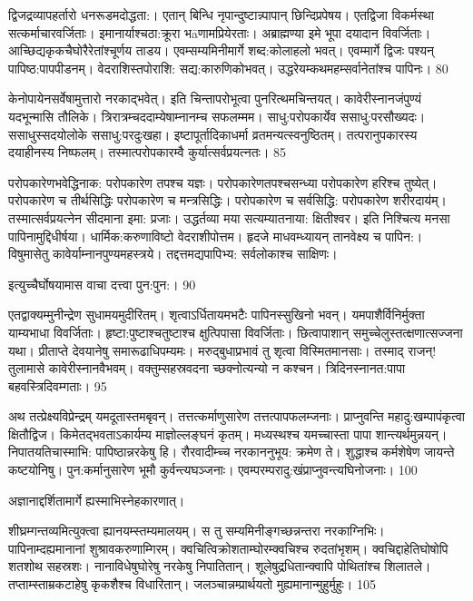 द्विजद्रव्यापहर्तारो धनरूडमदोद्धता:।
एतान् बिन्धि नृपान्दुष्टान्न्पापान् छिन्दिप्रपेषय।
एतद्विजा विकर्मस्था सत्कर्माचारवर्जिताः।
इमानार्याश्चठा:क्रूरा भāणामप्रियेरताः।
अब्राह्मण्या इमे भूपा दयादान विवर्जिताः।
आच्छिद्यकृकचैघोरैरेतांश्चूर्णय ताडय।
एवम्सम्यमिनीमार्गे शब्द:कोलाहलो भवत्।
एवम्मार्गे द्विजः पश्यन् पापिष्ठ:पापपीडनम्।
वेदराशिस्तपोराशि: सद्य:कारुणिकोभवत्।
उद्धरेयम्कथमहम्सर्वानेतांश्च पापिनः।
80



केनोपायेनसर्वेषामुत्तारो नरकाद्भवेत्।
इति चिन्तापरोभूत्वा पुनरित्थमचिन्तयत्।
कावेरीस्नानजंपुण्यं यदभून्मासि तौलिके।
त्रिरात्रम्चददाम्येषाम्नानम्च सफलम्मम।
साधु:परोपकार्येव ससाधु:परसौख्यदः।
ससाधुस्सदयोलोके ससाधु:परदुःखहा।
इष्टापूर्तादिकाधर्मा व्रतमन्यत्स्वनुष्ठितम्।
तत्परानुपकारस्य दयाहीनस्य निष्फलम्।
तस्मात्परोपकारम्वै कुर्यात्सर्वप्रयत्नतः।
85

परोपकारेणभवेद्धिनाक: परोपकारेण तपश्च यज्ञः।
परोपकारेणतपश्चसन्ध्या परोपकारेण हरिश्च तुष्येत्।
परोपकारेण च तीर्थसिद्धिः
परोपकारेण च मन्त्रसिद्धिः।
परोपकारेण च सर्वसिद्धि:
परोपकारेण शरीरदाय॑म्।
तस्मात्सर्वप्रयत्नेन सीदमाना इमा: प्रजाः।
उद्धर्तव्या मया सत्यम्यातनाया: क्षितीश्वर।
इति निश्चित्य मनसा पापिनामुद्दिधीर्षया।
धार्मिक:करुणाविष्टो वेदराशीपोत्तम।
हृदजे माधवम्ध्यायन् तानवेक्ष्य च पापिन:।
विषुमासेतु कावेर्याम्नानपुण्यमहस्त्रये।
तद्दत्तमद्यपापिभ्य: सर्वलोकाश्च साक्षिणः।


इत्युच्चैर्घोषयामास वाचा दत्त्वा पुन:पुन:।
90

एतद्वाक्यम्मुनीन्द्रेण सुधामयमुदीरितम्।
शृत्वाऽर्धितायमभटैः पापिनस्सुखिनो भवन्।
यमपाशैर्विनिर्मुक्ता याम्यभाधा विवर्जिताः।
हृष्टा:पुष्टाश्चतुष्टाश्च क्षुत्पिपासा विवर्जिताः।
छित्वापाशान् समुच्चेलुस्तत्क्षणात्सज्जना यथा।
प्रीताप्ते देवयानेषु समारूढाधिपम्यमः।
मरुद्बुधाप्रभावं तु शृत्वा विस्मितमानसाः।
तस्माद् राजन्! तुलामासे कावेरीस्नानवैभवम्।
वक्तुम्सहस्रवदना च्छक्नोत्यन्यो न कश्चन।
त्रिदिनस्नानत:पापा बहवस्त्रिदिवम्गताः।
95

अथ तत्प्रेक्ष्यविप्रेन्द्रम् यमदूतास्तमबृवन्।
तत्तत्कर्माणुसारेण तत्तत्पापफलम्जनाः।
प्राप्नुवन्ति महादु:खम्पापंकृत्वा क्षितौद्विज।
किमेतद्भवताऽकार्यम्य माज्ञोल्लङ्घनं कृतम्।
मध्यस्थश्च यमच्चास्ता पापा शान्त्यर्थमुन्नयन्।
निपातयतिचास्माभि: पापिष्ठान्नरकेषु हि।
रौरवादीम्च्च नरकाननुभूय: क्रमेण ते।
शुद्धाश्च कर्मशेषेण जायन्ते कष्टयोनिषु।
पुन:कर्मानुसारेण भूमौ कुर्वन्त्यघञ्जनाः।
एवम्परम्परादु:खंप्राप्नुवन्त्यघिनोजनाः।
100

अज्ञानाद्दर्शितामार्गे ह्यस्माभिस्नेहकारणात्।


शीघ्रम्गन्तव्यमित्युक्त्वा ह्यानयम्स्तम्यमालयम्।
स तु सम्यमिनीङ्गच्छन्नन्तरा नरकाग्निभिः।
पापिनाम्दह्यमानानां शुश्रावकरुणाम्गिरम्।
क्वचित्विक्रोशताम्घोरम्क्वचिश्च रुदतांभृशम्।
क्वचिद्दाहेतिघोषोपि शतशोथ सहस्रशः।
नानाविधेषुघोरेषु नरकेषु निपातितान्।
शूलेषुद्रधितान्क्वापि पोथितांश्च शिलातले।
तप्ताम्स्ताम्रकटाहेषु कृकशैश्च विधारितान्।
जलञ्चान्नम्प्रार्थयतो मुह्यमानान्मुहुर्मुहुः।
105

